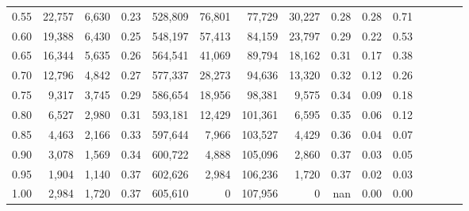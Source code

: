 \begin{tabular}{rrrcrrrrrrrrrrr}
0.55 &  22,757 &   6,630 &                                       0.23 &  528,809 &   76,801 &   77,729 &   30,227 &  0.28 &  0.28 &                         0.71 \\
0.60 &  19,388 &   6,430 &                                       0.25 &  548,197 &   57,413 &   84,159 &   23,797 &  0.29 &  0.22 &                         0.53 \\
0.65 &  16,344 &   5,635 &                                       0.26 &  564,541 &   41,069 &   89,794 &   18,162 &  0.31 &  0.17 &                         0.38 \\
0.70 &  12,796 &   4,842 &                                       0.27 &  577,337 &   28,273 &   94,636 &   13,320 &  0.32 &  0.12 &                         0.26 \\
0.75 &   9,317 &   3,745 &                                       0.29 &  586,654 &   18,956 &   98,381 &    9,575 &  0.34 &  0.09 &                         0.18 \\
0.80 &   6,527 &   2,980 &                                       0.31 &  593,181 &   12,429 &  101,361 &    6,595 &  0.35 &  0.06 &                         0.12 \\
0.85 &   4,463 &   2,166 &                                       0.33 &  597,644 &    7,966 &  103,527 &    4,429 &  0.36 &  0.04 &                         0.07 \\
0.90 &   3,078 &   1,569 &                                       0.34 &  600,722 &    4,888 &  105,096 &    2,860 &  0.37 &  0.03 &                         0.05 \\
0.95 &   1,904 &   1,140 &                                       0.37 &  602,626 &    2,984 &  106,236 &    1,720 &  0.37 &  0.02 &                         0.03 \\
1.00 &   2,984 &   1,720 &                                       0.37 &  605,610 &        0 &  107,956 &        0 &   nan &  0.00 &                         0.00 \\
\bottomrule
\end{tabular}
